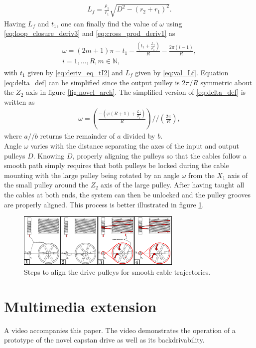 \documentclass[10pt,cleanfoot]{asme2ej}
\begin{document}
\begin{align}
L_f = \frac{\rho_1}{r_1}\sqrt{D^2-(r_2+r_1)^2}.
\label{eq:val_Lf}
\end{align}
Having $L_f$ and $t_1$, one can finally find the value of $\omega$ using \eqref{eq:loop_closure_deriv3} and \eqref{eq:cross_prod_deriv1} as 
\begin{align}
\begin{multlined}
\omega = \left(2m+1\right)\pi-t_1-\frac{\left(t_1+\frac{L_f}{\rho_1}\right)}{R}-\frac{2\pi(i-1)}{R},\\ i=1 ,\ldots , R, m \in \mathbb{N},
\label{eq:delta_def}
\end{multlined}
\end{align}
with $t_1$ given by \eqref{eq:deriv_eq_tI2} and $L_f$ given by \eqref{eq:val_Lf}. Equation \eqref{eq:delta_def} can be simplified since the output pulley is $2\pi/R$ symmetric about the $Z_2$ axis in figure \ref{fig:novel_arch}. The simplified version of \eqref{eq:delta_def} is written as
\begin{align}
\omega = \left(\frac{-\left(\varphi\left(R+1\right)+\frac{L_f}{\rho_1}\right)}{R}\right)//\left(\frac{2\pi}{R}\right),
\end{align}
where $a//b$ returns the remainder of $a$ divided by $b$.\\

Angle $\omega$ varies with the distance separating the axes of the input and output pulleys $D$. Knowing $D$, properly aligning the pulleys so that the cables follow a smooth path simply requires that both pulleys be locked during the cable mounting with the large pulley being rotated by an angle $\omega$ from the $X_1$ axis of the small pulley around the $Z_2$ axis of the large pulley. After having taught all the cables at both ends, the system can then be unlocked and the pulley grooves are properly aligned. This process is better illustrated in figure \ref{fig:process_align}.
\begin{figure}
\centering
\includegraphics[width = 0.7\textwidth]{steps.eps}
\caption{Steps to align the drive pulleys for smooth cable trajectories.}
\label{fig:process_align}
\end{figure}
\section{Multimedia extension}
A video accompanies this paper. The video demonstrates the operation of a prototype of the novel capstan drive as well as its backdrivability.
\end{document}
